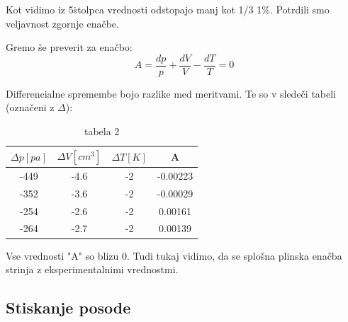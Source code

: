 \documentclass[11pt]{article}
\begin{document}
    Kot vidimo iz 5\. stolpca vrednosti odstopajo manj kot 1/3 1\%.
    Potrdili smo veljavnost zgornje enačbe.

    Gremo še preverit za enačbo:
    \[
        A = \frac{dp}{p} + \frac{dV}{V} - \frac{dT}{T} = 0
    \]

    Differencialne spremembe bojo razlike med meritvami.
    Te so v sledeči tabeli (označeni z $\Delta$):

    \begin{table}[H]
        \centering
        \begin{tabular}{|c|c|c|c|}
            \hline
            $\Delta p [pa]$ & $\Delta V [cm^3]$ & $\Delta T [K]$ & A \\
            \hline
            -449 & -4.6 & -2 & -0.00223 \\
            -352 & -3.6 & -2 & -0.00029 \\
            -254 & -2.6 & -2 &  0.00161 \\
            -264 & -2.7 & -2 &  0.00139 \\
            \hline
        \end{tabular}
        \caption{tabela 2}
        \label{tab:2}
    \end{table}

    Vse vrednosti "A" so blizu 0.
    Tudi tukaj vidimo, da se splošna plinska enačba strinja z eksperimentalnimi vrednostmi.

    \subsection{Stiskanje posode}
\end{document}

